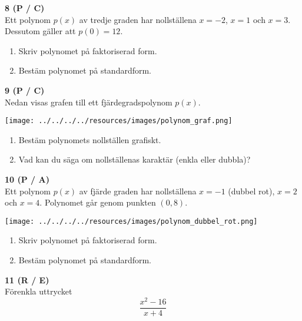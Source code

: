 \documentclass[12pt]{article}
\begin{document}
\vspace{0.5cm}

\noindent
\textbf{8 (P / C)} \\
Ett polynom $p(x)$ av tredje graden har nollställena $x = -2$, $x = 1$ och $x = 3$. Dessutom gäller att $p(0) = 12$.
\begin{enumerate}[label=\alph*)]
    \item Skriv polynomet på faktoriserad form.
    \item Bestäm polynomet på standardform.
\end{enumerate}

\vspace{0.5cm}

\noindent
\textbf{9 (P / C)} \\
Nedan visas grafen till ett fjärdegradspolynom $p(x)$.

\begin{center}
\texttt{[image: ../../../../resources/images/polynom\_graf.png]}
\end{center}

\begin{enumerate}[label=\alph*)]
    \item Bestäm polynomets nollställen grafiskt.
    \item Vad kan du säga om nollställenas karaktär (enkla eller dubbla)?
\end{enumerate}

\newpage

\noindent
\textbf{10 (P / A)} \\
Ett polynom $p(x)$ av fjärde graden har nollställena $x = -1$ (dubbel rot), $x = 2$ och $x = 4$. Polynomet går genom punkten $(0, 8)$.

\begin{center}
\texttt{[image: ../../../../resources/images/polynom\_dubbel\_rot.png]}
\end{center}

\begin{enumerate}[label=\alph*)]
    \item Skriv polynomet på faktoriserad form.
    \item Bestäm polynomet på standardform.
\end{enumerate}

\newpage

\noindent
\textbf{11 (R / E)} \\
Förenkla uttrycket
\[
\frac{x^2 - 16}{x + 4}
\]

\vspace{0.5cm}
\end{document}
